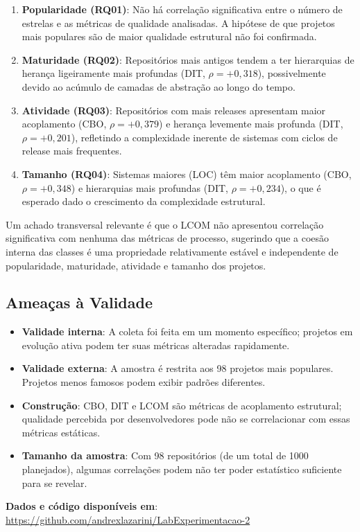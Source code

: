 \documentclass[12pt,a4paper]{article}
\begin{document}
\begin{enumerate}
    \item \textbf{Popularidade (RQ01)}: Não há correlação significativa entre
    o número de estrelas e as métricas de qualidade analisadas. A hipótese
    de que projetos mais populares são de maior qualidade estrutural não
    foi confirmada.

    \item \textbf{Maturidade (RQ02)}: Repositórios mais antigos tendem a ter
    hierarquias de herança ligeiramente mais profundas (DIT, $\rho = +0{,}318$),
    possivelmente devido ao acúmulo de camadas de abstração ao longo do tempo.

    \item \textbf{Atividade (RQ03)}: Repositórios com mais releases apresentam
    maior acoplamento (CBO, $\rho = +0{,}379$) e herança levemente mais profunda
    (DIT, $\rho = +0{,}201$), refletindo a complexidade inerente de sistemas
    com ciclos de release mais frequentes.

    \item \textbf{Tamanho (RQ04)}: Sistemas maiores (LOC) têm maior acoplamento
    (CBO, $\rho = +0{,}348$) e hierarquias mais profundas (DIT, $\rho = +0{,}234$),
    o que é esperado dado o crescimento da complexidade estrutural.
\end{enumerate}

Um achado transversal relevante é que o LCOM não apresentou correlação
significativa com nenhuma das métricas de processo, sugerindo que a coesão
interna das classes é uma propriedade relativamente estável e independente
de popularidade, maturidade, atividade e tamanho dos projetos.

\subsection{Ameaças à Validade}

\begin{itemize}
    \item \textbf{Validade interna}: A coleta foi feita em um momento específico;
    projetos em evolução ativa podem ter suas métricas alteradas rapidamente.

    \item \textbf{Validade externa}: A amostra é restrita aos 98 projetos
    mais populares. Projetos menos famosos podem exibir padrões diferentes.

    \item \textbf{Construção}: CBO, DIT e LCOM são métricas de acoplamento
    estrutural; qualidade percebida por desenvolvedores pode não se correlacionar
    com essas métricas estáticas.

    \item \textbf{Tamanho da amostra}: Com 98 repositórios (de um total de 1000
    planejados), algumas correlações podem não ter poder estatístico suficiente
    para se revelar.
\end{itemize}

\vspace{1em}
\noindent
\textbf{Dados e código disponíveis em}:
\url{https://github.com/andrexlazarini/LabExperimentacao-2}
\end{document}
